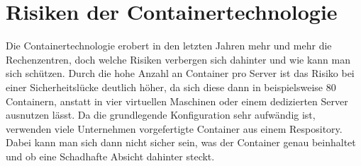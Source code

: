\section{Risiken der Containertechnologie}
\label{sec:Risiken der Containertechnologie}
Die Containertechnologie erobert in den letzten Jahren mehr und mehr die Rechenzentren, doch welche Risiken verbergen sich dahinter und wie kann man sich schützen. \newline
Durch die hohe Anzahl an Container pro Server ist das Risiko bei einer Sicherheitslücke deutlich höher, da sich diese dann in beispielsweise 80 Containern, anstatt in vier virtuellen Maschinen oder einem dedizierten Server ausnutzen lässt. Da die grundlegende Konfiguration sehr aufwändig ist, verwenden viele Unternehmen vorgefertigte Container aus einem Respository. Dabei kann man sich dann nicht sicher sein, was der Container genau beinhaltet und ob eine Schadhafte Absicht dahinter steckt.
\cite{Risiken}  
